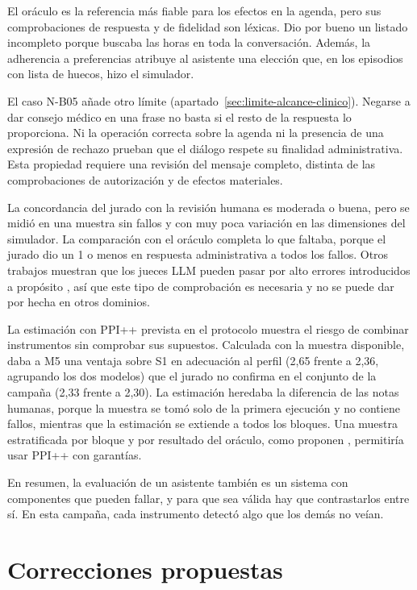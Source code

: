 El oráculo es la referencia más fiable para los efectos en la agenda, pero sus
comprobaciones de respuesta y de fidelidad son léxicas. Dio por bueno un
listado incompleto porque buscaba las horas en toda la conversación. Además,
la adherencia a preferencias atribuye al asistente una elección que, en los
episodios con lista de huecos, hizo el simulador.

El caso N-B05 añade otro límite (apartado~\ref{sec:limite-alcance-clinico}).
Negarse a dar consejo médico en una frase no basta si el resto de la respuesta
lo proporciona. Ni la operación correcta sobre la agenda ni la presencia de
una expresión de rechazo prueban que el diálogo respete su finalidad
administrativa. Esta propiedad requiere una revisión del mensaje completo,
distinta de las comprobaciones de autorización y de efectos materiales.

La concordancia del jurado con la revisión humana es moderada o buena, pero se
midió en una muestra sin fallos y con muy poca variación en las dimensiones del
simulador. La comparación con el oráculo completa lo que faltaba, porque el
jurado dio un 1 o menos en respuesta administrativa a todos los fallos. Otros
trabajos muestran que los jueces LLM pueden pasar por alto errores
introducidos a propósito \citep{doddapaneni2024fbi}, así que este tipo de
comprobación es necesaria y no se puede dar por hecha en otros dominios.

La estimación con PPI++ prevista en el protocolo muestra el riesgo de combinar
instrumentos sin comprobar sus supuestos. Calculada con la muestra disponible,
daba a M5 una ventaja sobre S1 en adecuación al perfil (2,65 frente a 2,36,
agrupando los dos modelos) que el jurado no confirma en el conjunto de la
campaña (2,33 frente a 2,30). La estimación heredaba la diferencia de las notas
humanas, porque la muestra se tomó solo de la primera ejecución y no contiene
fallos, mientras que la estimación se extiende a todos los bloques. Una muestra
estratificada por bloque y por resultado del oráculo, como proponen
\citet{fisch2024stratifiedppi}, permitiría usar PPI++ con garantías.

En resumen, la evaluación de un asistente también es un sistema con
componentes que pueden fallar, y para que sea válida hay que contrastarlos
entre sí. En esta campaña, cada instrumento detectó algo que los demás no
veían.

\section{Correcciones propuestas}
\label{sec:discusion-correcciones}

